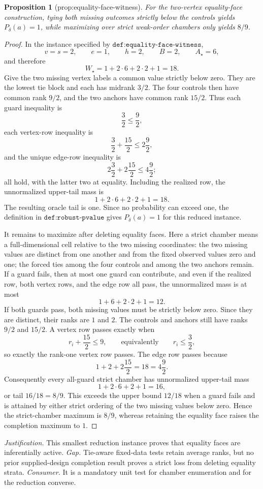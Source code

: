\documentclass{article}
\newtheorem{proposition}{Proposition}
\begin{document}
\begin{proposition}[prop:equality-face-witness]\label{prop:equality-face-witness}
For the two-vertex equality-face construction, tying both missing outcomes strictly below the controls yields \(P_\delta(a)=1\), while maximizing over strict weak-order chambers only yields \(8/9\).
\end{proposition}
\begin{proof}
In the instance specified by \(\texttt{def:equality-face-witness}\),
\[
 v=s=2,\qquad e=1,\qquad h=2,
 \qquad B=2,
 \qquad A_\star=6,
\]
and therefore
\[
 W_\star=1+2\cdot6+2\cdot2+1=18.
\]
Give the two missing vertex labels a common value strictly below zero.  They are the lowest tie block and each has midrank \(3/2\).  The four controls then have common rank \(9/2\), and the two anchors have common rank \(15/2\).  Thus each guard inequality is
\[
 \frac32\le\frac92,
\]
each vertex-row inequality is
\[
 \frac32+\frac{15}{2}\le2\frac92,
\]
and the unique edge-row inequality is
\[
 2\frac32+2\frac{15}{2}\le4\frac92;
\]
all hold, with the latter two at equality.  Including the realized row, the unnormalized upper-tail mass is
\[
 1+2\cdot6+2\cdot2+1=18.
\]
The resulting oracle tail is one.  Since no probability can exceed one, the definition in \(\texttt{def:robust-pvalue}\) gives \(P_\delta(a)=1\) for this reduced instance.

It remains to maximize after deleting equality faces.  Here a strict chamber means a full-dimensional cell relative to the two missing coordinates: the two missing values are distinct from one another and from the fixed observed values zero and one; the forced ties among the four controls and among the two anchors remain.  If a guard fails, then at most one guard can contribute, and even if the realized row, both vertex rows, and the edge row all pass, the unnormalized mass is at most
\[
 1+6+2\cdot2+1=12.
\]
If both guards pass, both missing values must be strictly below zero.  Since they are distinct, their ranks are \(1\) and \(2\).  The controls and anchors still have ranks \(9/2\) and \(15/2\).  A vertex row passes exactly when
\[
 r_i+\frac{15}{2}\le 9,
 \qquad\text{equivalently}\qquad
 r_i\le\frac32,
\]
so exactly the rank-one vertex row passes.  The edge row passes because
\[
 1+2+2\frac{15}{2}=18=4\frac92.
\]
Consequently every all-guard strict chamber has unnormalized upper-tail mass
\[
 1+2\cdot6+2+1=16,
\]
or tail \(16/18=8/9\).  This exceeds the upper bound \(12/18\) when a guard fails and is attained by either strict ordering of the two missing values below zero.  Hence the strict-chamber maximum is \(8/9\), whereas retaining the equality face raises the completion maximum to \(1\).
\end{proof}
\par\smallskip\noindent \textit{Justification.} This smallest reduction instance proves that equality faces are inferentially active. \textit{Gap.} Tie-aware fixed-data tests retain average ranks, but no prior supplied-design completion result proves a strict loss from deleting equality strata. \textit{Consumer.} It is a mandatory unit test for chamber enumeration and for the reduction converse.
\end{document}
